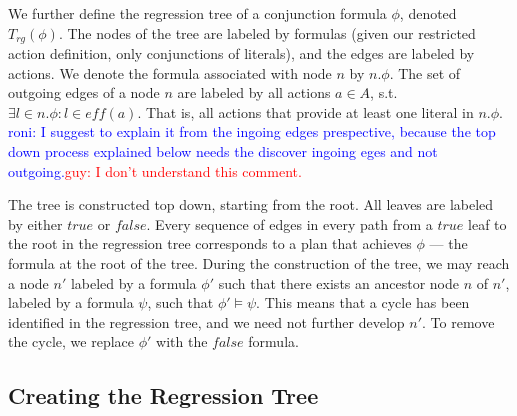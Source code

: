 \documentclass[letterpaper]{article}
\newcommand\roni[1]{\textcolor{blue}{roni: #1}}
\newcommand\guy[1]{\textcolor{red}{guy: #1}}
\theoremstyle{definition}
\begin{document}
We further define the regression tree of a conjunction formula $\phi$, denoted $T_{rg}(\phi)$. The nodes of the tree are labeled by formulas (given our restricted action definition, only conjunctions of literals), and the edges are labeled by actions. We denote the formula associated with node $n$ by $n.\phi$. The set of outgoing edges of a node $n$ are labeled by all actions $a \in A$, s.t. $\exists l \in n.\phi : l \in eff(a)$. That is, all actions that provide at least one literal in $n.\phi$. \roni{I suggest to explain it from the ingoing edges prespective, because  the top down process explained below needs the discover ingoing eges and not outgoing.}\guy{I don't understand this comment.}

The tree is constructed top down, starting from the root. All leaves are labeled by either $true$ or $false$. Every sequence of edges in every path from a $true$ leaf to the root in the regression tree corresponds to a plan that achieves $\phi$ --- the formula at the root of the tree. During the construction of the tree, we may reach a node $n'$ labeled by a formula $\phi'$ such that there exists an ancestor node $n$ of $n'$, labeled by a formula $\psi$, such that $\phi' \models \psi$. This means that a cycle has been identified in the regression tree, and we need not further develop $n'$. To remove the cycle, we replace $\phi'$ with the $false$ formula. 


\subsection{Creating the Regression Tree}
\end{document}
